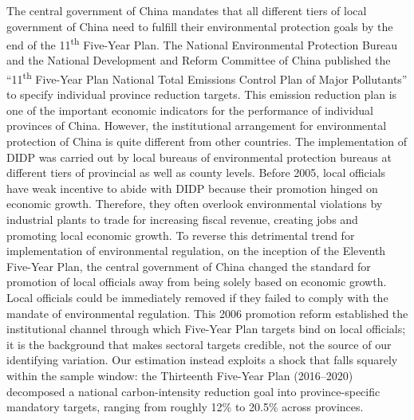 \documentclass[11pt,a4paper]{article}
\begin{document}
The central government of China mandates that all different tiers of local government of China need to fulfill their environmental protection goals by the end of the 11\textsuperscript{th} Five-Year Plan. The National Environmental Protection Bureau and the National Development and Reform Committee of China published the ``11\textsuperscript{th} Five-Year Plan National Total Emissions Control Plan of Major Pollutants'' to specify individual province reduction targets. This emission reduction plan is one of the important economic indicators for the performance of individual provinces of China. However, the institutional arrangement for environmental protection of China is quite different from other countries. The implementation of DIDP was carried out by local bureaus of environmental protection bureaus at different tiers of provincial as well as county levels. Before 2005, local officials have weak incentive to abide with DIDP because their promotion hinged on economic growth. Therefore, they often overlook environmental violations by industrial plants to trade for increasing fiscal revenue, creating jobs and promoting local economic growth. To reverse this detrimental trend for implementation of environmental regulation, on the inception of the Eleventh Five-Year Plan, the central government of China changed the standard for promotion of local officials away from being solely based on economic growth. Local officials could be immediately removed if they failed to comply with the mandate of environmental regulation. This 2006 promotion reform established the institutional channel through which Five-Year Plan targets bind on local officials; it is the background that makes sectoral targets credible, not the source of our identifying variation. Our estimation instead exploits a shock that falls squarely within the sample window: the Thirteenth Five-Year Plan (2016--2020) decomposed a national carbon-intensity reduction goal into province-specific mandatory targets, ranging from roughly 12\% to 20.5\% across provinces.%
\end{document}
